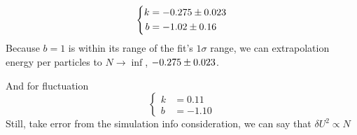 \documentclass[UTF8,a4paper]{article}
\begin{document}
\begin{equation}
	\left\{
		\begin{aligned}
			k &= \num[separate-uncertainty = true]{-0.275+-0.023}\\
			b &= \num[separate-uncertainty = true]{-1.02+-0.16}
		\end{aligned}
	\right.
\end{equation}
Because $b=1$ is within its range of the fit's $1\sigma$ range, we can extrapolation energy per particles to $N\to \inf$, $\num[separate-uncertainty = true]{-0.275+-0.023}$.

And for fluctuation
\begin{equation}
	\left\{
		\begin{aligned}
			k &= 0.11\\
			b &= -1.10
		\end{aligned}
	\right.
\end{equation}
Still, take error from the simulation info consideration, we can say that $\delta U^2\propto N$
\end{document}
